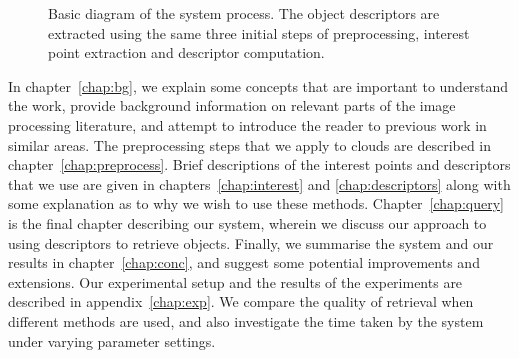 \documentclass[11pt,a4paper]{kth-mag}
\begin{document}
\begin{figure}
  \centering
  \caption{Basic diagram of the system process. The object descriptors are
    extracted using the same three initial steps of preprocessing, interest
    point extraction and descriptor computation.}
  \label{fig:sysflow}
\end{figure}

In chapter~\ref{chap:bg}, we explain some concepts that are important to
understand the work, provide background information on relevant parts of the
image processing literature, and attempt to introduce the reader to previous
work in similar areas. The preprocessing steps that we apply to clouds are
described in chapter~\ref{chap:preprocess}. Brief descriptions of the interest
points and descriptors that we use are given in chapters~\ref{chap:interest} and
\ref{chap:descriptors} along with some explanation as to why we wish to use
these methods. Chapter~\ref{chap:query} is the final chapter describing our
system, wherein we discuss our approach to using descriptors to retrieve
objects. Finally, we summarise the system and our results in
chapter~\ref{chap:conc}, and suggest some potential improvements and extensions.
Our experimental setup and the results of the experiments are described in
appendix~\ref{chap:exp}. We compare the quality of retrieval when different
methods are used, and also investigate the time taken by the system under
varying parameter settings.
\end{document}
